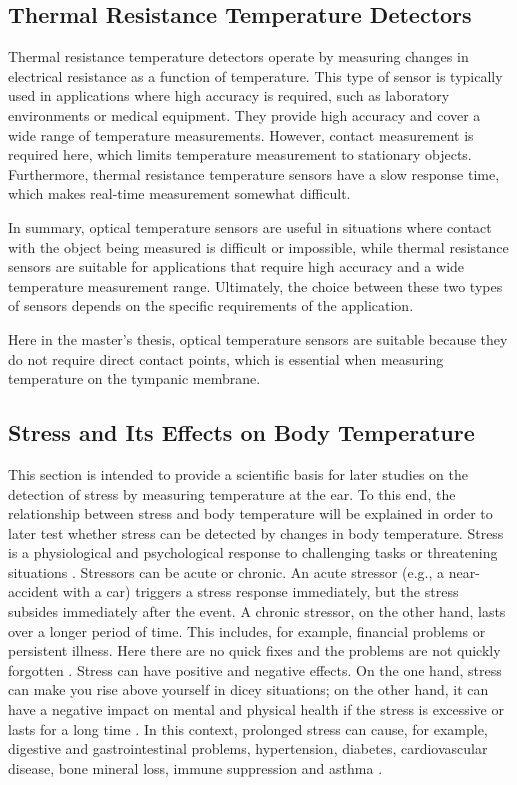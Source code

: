 \subsection{Thermal Resistance Temperature Detectors}
\label{Background:TemperatureSensors:ResistanceTD}
Thermal resistance temperature detectors operate by measuring changes in electrical resistance as a function of temperature. 
This type of sensor is typically used in applications where high accuracy is required, such as laboratory environments or medical equipment.
They provide high accuracy and cover a wide range of temperature measurements.
However, contact measurement is required here, which limits temperature measurement to stationary objects.
Furthermore, thermal resistance temperature sensors have a slow response time, which makes real-time measurement somewhat difficult.

In summary, optical temperature sensors are useful in situations where contact with the object being measured is difficult or impossible, while thermal resistance sensors are suitable for applications that require high accuracy and a wide temperature measurement range. 
Ultimately, the choice between these two types of sensors depends on the specific requirements of the application.

Here in the master's thesis, optical temperature sensors are suitable because they do not require direct contact points, which is essential when measuring temperature on the tympanic membrane.

\subsection{Stress and Its Effects on Body Temperature}
This section is intended to provide a scientific basis for later studies on the detection of stress by measuring temperature at the ear. 
To this end, the relationship between stress and body temperature will be explained in order to later test whether stress can be detected by changes in body temperature.
Stress is a physiological and psychological response to challenging tasks or threatening situations \cite{jamesUnderstandingRelationshipsPhysiological2023}. 
Stressors can be acute or chronic.
An acute stressor (e.g., a near-accident with a car) triggers a stress response immediately, but the stress subsides immediately after the event.
A chronic stressor, on the other hand, lasts over a longer period of time. 
This includes, for example, financial problems or persistent illness.
Here there are no quick fixes and the problems are not quickly forgotten \cite{baumControlIntrusiveMemories1993}.
Stress can have positive and negative effects.
On the one hand, stress can make you rise above yourself in dicey situations; on the other hand, it can have a negative impact on mental and physical health if the stress is excessive or lasts for a long time \cite{jamesUnderstandingRelationshipsPhysiological2023}.
In this context, prolonged stress can cause, for example, digestive and gastrointestinal problems, hypertension, diabetes, cardiovascular disease, bone mineral loss, immune suppression and asthma \cite{merabetHowExposureChronic2022, dhamaBiomarkersStressRelated2019, petriePrevalencePTSDCommon2018}.

